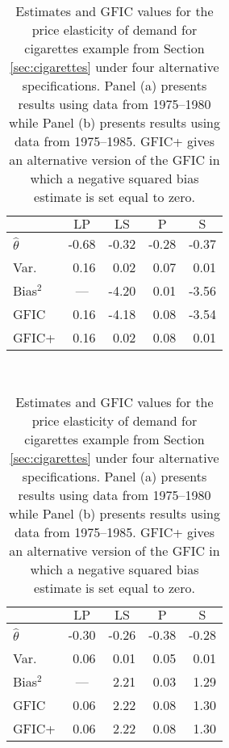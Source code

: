 \begin{table}[htbp]
  \centering
    \begin{subtable}[h]{0.45\textwidth}
        \centering
     \caption{1975--1980 ($T=6$)}
     \label{tab:cigarettesShort}
     \begin{tabular}{lrrrr}\hline\hline 
         & \multicolumn{1}{c}{$\text{LP}$} & \multicolumn{1}{c}{$\text{LS}$} 
          & \multicolumn{1}{c}{$\text{P}$} & \multicolumn{1}{c}{$\text{S}$}\\
        \hline
        $\widehat{\theta}$ & -0.68 & -0.32 &  -0.28 &  -0.37\\
        Var.\ & 0.16 &  0.02 & 0.07 & 0.01\\ 
        Bias$^2$ & \multicolumn{1}{c}{---} & -4.20 & 0.01 & -3.56 \\
        GFIC  & 0.16 & -4.18 & 0.08  & -3.54  \\
        GFIC+  & 0.16 &  0.02 & 0.08  & 0.01    \\
        \hline
      \end{tabular}
    \end{subtable}
    ~
    \begin{subtable}[h]{0.45\textwidth}
      \centering
     \caption{1975--1985 ($T=11$)}
     \label{tab:cigarettesLong}
     \begin{tabular}{lrrrr}\hline\hline 
         & \multicolumn{1}{c}{$\text{LP}$} & \multicolumn{1}{c}{$\text{LS}$} 
          & \multicolumn{1}{c}{$\text{P}$} & \multicolumn{1}{c}{$\text{S}$}\\
        \hline
        $\widehat{\theta}$ & -0.30 & -0.26 &  -0.38 &  -0.28\\
        Var.\ & 0.06 & 0.01 & 0.05 & 0.01\\ 
        Bias$^2$ & \multicolumn{1}{c}{---} & 2.21 & 0.03 & 1.29\\
        GFIC  &0.06 & 2.22 & 0.08 &  1.30\\
        GFIC+  & 0.06 & 2.22 & 0.08  & 1.30  \\
           \hline
      \end{tabular}
    \end{subtable}
    \caption{Estimates and GFIC values for the price elasticity of demand for cigarettes example from Section \ref{sec:cigarettes} under four alternative specifications. Panel (a) presents results using data from 1975--1980 while Panel (b) presents results using data from 1975--1985. 
GFIC+ gives an alternative version of the GFIC in which a negative squared bias estimate is set equal to zero.}
    \label{tab:cigarettes}
\end{table}

